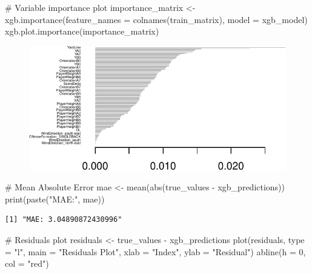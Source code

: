 \documentclass[
  super,
  preprint,
  3p]{elsarticle}
\newenvironment{Shaded}{\begin{snugshade}}{\end{snugshade}}
\newcommand{\AttributeTok}[1]{\textcolor[rgb]{0.40,0.45,0.13}{#1}}
\newcommand{\CommentTok}[1]{\textcolor[rgb]{0.37,0.37,0.37}{#1}}
\newcommand{\DecValTok}[1]{\textcolor[rgb]{0.68,0.00,0.00}{#1}}
\newcommand{\FunctionTok}[1]{\textcolor[rgb]{0.28,0.35,0.67}{#1}}
\newcommand{\NormalTok}[1]{\textcolor[rgb]{0.00,0.23,0.31}{#1}}
\newcommand{\OtherTok}[1]{\textcolor[rgb]{0.00,0.23,0.31}{#1}}
\newcommand{\SpecialCharTok}[1]{\textcolor[rgb]{0.37,0.37,0.37}{#1}}
\newcommand{\StringTok}[1]{\textcolor[rgb]{0.13,0.47,0.30}{#1}}
\begin{document}
\begin{Shaded}
\begin{Highlighting}[]
\CommentTok{\# Variable importance plot}
\NormalTok{importance\_matrix }\OtherTok{\textless{}{-}} \FunctionTok{xgb.importance}\NormalTok{(}\AttributeTok{feature\_names =} \FunctionTok{colnames}\NormalTok{(train\_matrix), }\AttributeTok{model =}\NormalTok{ xgb\_model)}
\FunctionTok{xgb.plot.importance}\NormalTok{(importance\_matrix)}
\end{Highlighting}
\end{Shaded}

\begin{figure}[H]

{\centering \includegraphics{project_report_files/figure-pdf/unnamed-chunk-15-1.pdf}

}

\end{figure}

\begin{Shaded}
\begin{Highlighting}[]
\CommentTok{\# Mean Absolute Error}
\NormalTok{mae }\OtherTok{\textless{}{-}} \FunctionTok{mean}\NormalTok{(}\FunctionTok{abs}\NormalTok{(true\_values }\SpecialCharTok{{-}}\NormalTok{ xgb\_predictions))}
\FunctionTok{print}\NormalTok{(}\FunctionTok{paste}\NormalTok{(}\StringTok{"MAE:"}\NormalTok{, mae))}
\end{Highlighting}
\end{Shaded}

\begin{verbatim}
[1] "MAE: 3.04890872430996"
\end{verbatim}

\begin{Shaded}
\begin{Highlighting}[]
\CommentTok{\# Residuals plot}
\NormalTok{residuals }\OtherTok{\textless{}{-}}\NormalTok{ true\_values }\SpecialCharTok{{-}}\NormalTok{ xgb\_predictions}
\FunctionTok{plot}\NormalTok{(residuals, }\AttributeTok{type =} \StringTok{"l"}\NormalTok{, }\AttributeTok{main =} \StringTok{"Residuals Plot"}\NormalTok{, }\AttributeTok{xlab =} \StringTok{"Index"}\NormalTok{, }\AttributeTok{ylab =} \StringTok{"Residual"}\NormalTok{)}
\FunctionTok{abline}\NormalTok{(}\AttributeTok{h =} \DecValTok{0}\NormalTok{, }\AttributeTok{col =} \StringTok{"red"}\NormalTok{)}
\end{Highlighting}
\end{Shaded}
\end{document}
